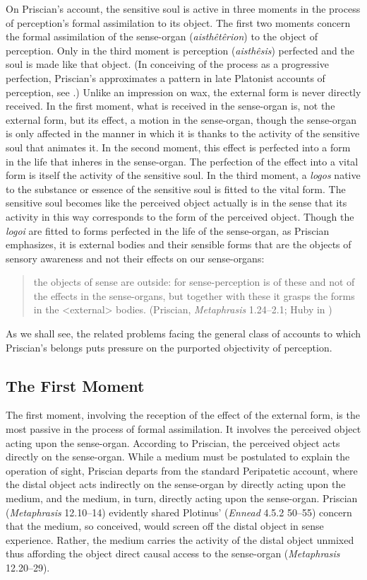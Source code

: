 \documentclass[12pt]{article}
\begin{document}
On Priscian's account, the sensitive soul is active in three moments in the process of perception's formal assimilation to its object. The first two moments concern the formal assimilation of the sense-organ (\emph{aisthêtêrion}) to the object of perception. Only in the third moment is perception (\emph{aisthêsis}) perfected and the soul is made like that object. (In conceiving of the process as a progressive perfection, Priscian's approximates a pattern in late Platonist accounts of perception, see \citealt[142]{Lloyd:1990dp}.) Unlike an impression on wax, the external form is never directly received. In the first moment, what is received in the sense-organ is, not the external form, but its effect, a motion in the sense-organ, though the sense-organ is only affected in the manner in which it is thanks to the activity of the sensitive soul that animates it. In the second moment, this effect is perfected into a form in the life that inheres in the sense-organ. The perfection of the effect into a vital form is itself the activity of the sensitive soul. In the third moment, a \emph{logos} native to the substance or essence of the sensitive soul is fitted to the vital form. The sensitive soul becomes like the perceived object actually is in the sense that its activity in this way corresponds to the form of the perceived object. Though the \emph{logoi} are fitted to forms perfected in the life of the sense-organ, as Priscian emphasizes, it is external bodies and their sensible forms that are the objects of sensory awareness and not their effects on our sense-organs:
\begin{quote}
	the objects of sense are outside: for sense-perception is of these and not of the effects in the sense-organs, but together with these it grasps the forms in the <external> bodies. (Priscian, \emph{Metaphrasis} 1.24--2.1; Huby in \citealt[9]{Sorabji:1997ly})
\end{quote}
As we shall see, the related problems facing the general class of accounts to which Priscian's belongs puts pressure on the purported objectivity of perception.

\subsection{The First Moment} %
\label{sub:the_first_moment}

The first moment, involving the reception of the effect of the external form, is the most passive in the process of formal assimilation. It involves the perceived object acting upon the sense-organ. According to Priscian, the perceived object acts directly on the sense-organ. While a medium must be postulated to explain the operation of sight, Priscian departs from the standard Peripatetic account, where the distal object acts indirectly on the sense-organ by directly acting upon the medium, and the medium, in turn, directly acting upon the sense-organ. Priscian (\emph{Metaphrasis} 12.10--14) evidently shared Plotinus' (\emph{Ennead} 4.5.2 50–55) concern that the medium, so conceived, would screen off the distal object in sense experience. Rather, the medium carries the activity of the distal object unmixed thus affording the object direct causal access to the sense-organ (\emph{Metaphrasis} 12.20--29).
\end{document}
